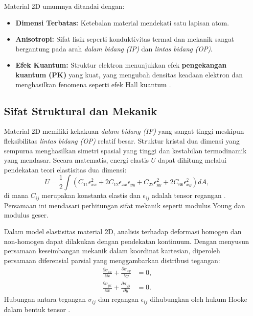 Material 2D umumnya ditandai dengan:
\begin{itemize}
    \item \textbf{Dimensi Terbatas:} Ketebalan material mendekati satu lapisan atom.
    \item \textbf{Anisotropi:} Sifat fisik seperti konduktivitas termal dan mekanik sangat bergantung pada arah \emph{dalam bidang (IP)} dan \emph{lintas bidang (OP)}.
    \item \textbf{Efek Kuantum:} Struktur elektron menunjukkan efek \textbf{pengekangan kuantum (PK)} yang kuat, yang mengubah densitas keadaan elektron dan menghasilkan fenomena seperti efek Hall kuantum \citep{das_beyond_2015}.
\end{itemize}

\subsection{Sifat Struktural dan Mekanik}
Material 2D memiliki kekakuan \emph{dalam bidang (IP)} yang sangat tinggi meskipun fleksibilitas \emph{lintas bidang (OP)} relatif besar. Struktur kristal dua dimensi yang sempurna menghasilkan simetri spasial yang tinggi dan kestabilan termodinamik yang mendasar. Secara matematis, energi elastis \( U \) dapat dihitung melalui pendekatan teori elastisitas dua dimensi:
\begin{equation}
    U = \frac{1}{2} \int \left( C_{11}\epsilon_{xx}^2 + 2C_{12}\epsilon_{xx}\epsilon_{yy} + C_{22}\epsilon_{yy}^2 + 2C_{66}\epsilon_{xy}^2 \right) dA,
\end{equation}
di mana \( C_{ij} \) merupakan konstanta elastis dan \( \epsilon_{ij} \) adalah tensor regangan \citep{lee_measurement_2008}. Persamaan ini mendasari perhitungan sifat mekanik seperti modulus Young dan modulus geser.
 
Dalam model elastisitas material 2D, analisis terhadap deformasi homogen dan non-homogen dapat dilakukan dengan pendekatan kontinuum. Dengan menyusun persamaan keseimbangan mekanik dalam koordinat kartesian, diperoleh persamaan diferensial parsial yang menggambarkan distribusi tegangan:
\begin{align}
    \frac{\partial \sigma_{xx}}{\partial x} + \frac{\partial \sigma_{xy}}{\partial y} &= 0, \nonumber \\
    \frac{\partial \sigma_{yx}}{\partial x} + \frac{\partial \sigma_{yy}}{\partial y} &= 0.
\end{align}
Hubungan antara tegangan \( \sigma_{ij} \) dan regangan \( \epsilon_{ij} \) dihubungkan oleh hukum Hooke dalam bentuk tensor \citep{timoshenko_theory_1970}.

